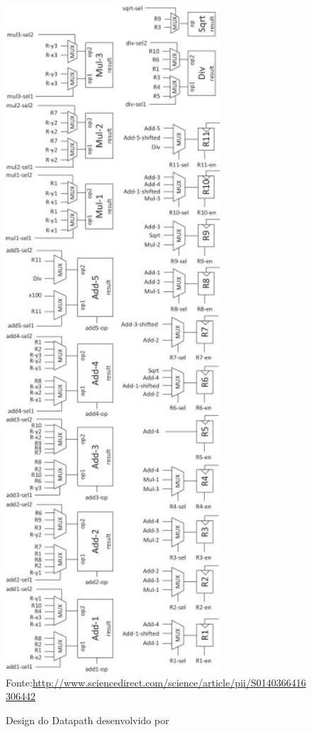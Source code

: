 \begin{figure}[H]
	\centering
	\caption{Design do Datapath desenvolvido por \cite{HOQUE201748}}
	\includegraphics[width=8cm]{figures/dp.jpg}\\
	{Fonte:\url{http://www.sciencedirect.com/science/article/pii/S0140366416306442}}
	\label{extend}
\end{figure}



